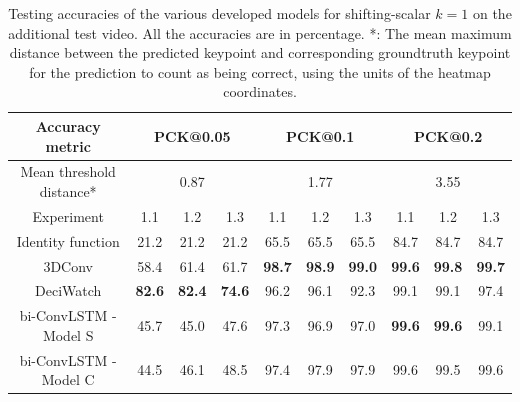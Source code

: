 \documentclass[./main.tex]{subfiles}
\begin{document}
\begin{table}[htbp]
    \begin{tabular}{c||ccc|ccc|ccc}
        \hline
        Accuracy metric & \multicolumn{3}{c}{PCK@0.05} & \multicolumn{3}{c}{PCK@0.1} & \multicolumn{3}{c}{PCK@0.2} \\
        \hline
        Mean threshold distance* & \multicolumn{3}{c}{0.87} & \multicolumn{3}{c}{1.77} & \multicolumn{3}{c}{3.55} \\
        \hline
        Experiment & 1.1 & 1.2 & 1.3 & 1.1 & 1.2 & 1.3 & 1.1 & 1.2 & 1.3 \\
        \hline
        \hline
        Identity function & 21.2 & 21.2 & 21.2 & 65.5 & 65.5 & 65.5 & 84.7 & 84.7 & 84.7 \\
        3DConv & 58.4 & 61.4 & 61.7 & \textbf{98.7} & \textbf{98.9} & \textbf{99.0} & \textbf{99.6} & \textbf{99.8} & \textbf{99.7} \\
        DeciWatch & \textbf{82.6} & \textbf{82.4} & \textbf{74.6} & 96.2 & 96.1 & 92.3 & 99.1 & 99.1 & 97.4 \\
        bi-ConvLSTM - Model S & 45.7 & 45.0 & 47.6 & 97.3 & 96.9 & 97.0 & \textbf{99.6} & \textbf{99.6} & 99.1 \\
        bi-ConvLSTM - Model C & 44.5 & 46.1 & 48.5 & 97.4 & 97.9 & 97.9 & 99.6 & 99.5 & 99.6 \\
        \hline
    \end{tabular}
    \caption{Testing accuracies of the various developed models for shifting-scalar $k = 1$ on the additional test video. All the accuracies are in percentage. *: The mean maximum distance between the predicted keypoint and corresponding groundtruth keypoint for the prediction to count as being correct, using the units of the heatmap coordinates.}
    \label{tab:finetune_test_accs_3}
\end{table}
\end{document}

